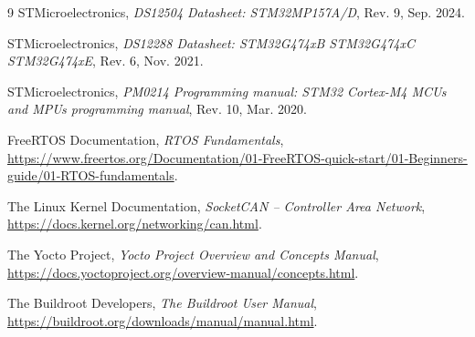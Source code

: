 \documentclass[12pt,a4paper]{article}
\begin{document}

\tableofcontents
\newpage



\begin{thebibliography}{9}
STMicroelectronics, \textit{DS12504 Datasheet: STM32MP157A/D}, Rev. 9, Sep. 2024.

STMicroelectronics, \textit{DS12288 Datasheet: STM32G474xB STM32G474xC STM32G474xE}, Rev. 6, Nov. 2021.

STMicroelectronics, \textit{PM0214 Programming manual: STM32 Cortex-M4 MCUs and MPUs programming manual}, Rev. 10, Mar. 2020.

FreeRTOS Documentation, \textit{RTOS Fundamentals}, \url{https://www.freertos.org/Documentation/01-FreeRTOS-quick-start/01-Beginners-guide/01-RTOS-fundamentals}.

The Linux Kernel Documentation, \textit{SocketCAN -- Controller Area Network}, \url{https://docs.kernel.org/networking/can.html}.

The Yocto Project, \textit{Yocto Project Overview and Concepts Manual}, \url{https://docs.yoctoproject.org/overview-manual/concepts.html}.

The Buildroot Developers, \textit{The Buildroot User Manual}, \url{https://buildroot.org/downloads/manual/manual.html}.
\end{thebibliography}
\end{document}

